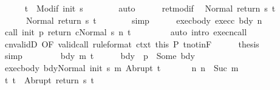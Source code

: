 \begin{isabellebody}
\ \ \ \ \isamarkupfalse%
\ {\isachardoublequoteopen}t{\isacharprime}\ {\isasymin}\ Modif\ {\isacharparenleft}init\ s{\isacharparenright}{\isachardoublequoteclose}\isanewline
\ \ \ \ \ \ \isamarkupfalse%
\ auto\isanewline
\ \ \ \ \isamarkupfalse%
\ ret{\isacharunderscore}modif\ \isamarkupfalse%
\ {\isachardoublequoteopen}Normal\ {\isacharparenleft}return{\isacharprime}\ s\ t{\isacharprime}{\isacharparenright}\ {\isacharequal}\ \isanewline
\ \ \ \ \ \ Normal\ {\isacharparenleft}return\ s\ t{\isacharprime}{\isacharparenright}{\isachardoublequoteclose}\isanewline
\ \ \ \ \ \ \isamarkupfalse%
\ simp\isanewline
\ \ \ \ \isamarkupfalse%
\ exec{\isacharunderscore}body\ exec{\isacharunderscore}c\ bdy\ n\isanewline
\ \ \ \ \isamarkupfalse%
\ {\isachardoublequoteopen}{\isasymGamma}{\isasymturnstile}{\isasymlangle}call\ init\ p\ return{\isacharprime}\ c{\isacharcomma}Normal\ s{\isasymrangle}\ {\isacharequal}n{\isasymRightarrow}\ t{\isachardoublequoteclose}\ \isanewline
\ \ \ \ \ \ \isamarkupfalse%
\ {\isacharparenleft}auto\ intro{\isacharcolon}\ execn{\isacharunderscore}call{\isacharparenright}\isanewline
\ \ \ \ \isamarkupfalse%
\ cnvalidD\ {\isacharbrackleft}OF\ valid{\isacharunderscore}call\ {\isacharbrackleft}rule{\isacharunderscore}format{\isacharbrackright}\ ctxt\ this{\isacharbrackright}\ P\ t{\isacharunderscore}notin{\isacharunderscore}F\isanewline
\ \ \ \ \isamarkupfalse%
\ {\isacharquery}thesis\isanewline
\ \ \ \ \ \ \isamarkupfalse%
\ simp\isanewline
\ \ \isamarkupfalse%
\isanewline
\ \ \ \ \isamarkupfalse%
\ bdy\ m\ t{\isacharprime}\isanewline
\ \ \ \ \isamarkupfalse%
\ bdy{\isacharcolon}\ {\isachardoublequoteopen}{\isasymGamma}\ p\ {\isacharequal}\ Some\ bdy{\isachardoublequoteclose}\isanewline
\ \ \ \ \isamarkupfalse%
\ exec{\isacharunderscore}body{\isacharcolon}\ {\isachardoublequoteopen}{\isasymGamma}{\isasymturnstile}{\isasymlangle}bdy{\isacharcomma}Normal\ {\isacharparenleft}init\ s{\isacharparenright}{\isasymrangle}\ {\isacharequal}m{\isasymRightarrow}\ Abrupt\ t{\isacharprime}{\isachardoublequoteclose}\ \isanewline
\ \ \ \ \isamarkupfalse%
\ n{\isacharcolon}\ {\isachardoublequoteopen}n\ {\isacharequal}\ Suc\ m{\isachardoublequoteclose}\isanewline
\ \ \ \ \isamarkupfalse%
\ t{\isacharcolon}\ {\isachardoublequoteopen}t\ {\isacharequal}\ Abrupt\ {\isacharparenleft}return\ s\ t{\isacharprime}{\isacharparenright}{\isachardoublequoteclose}\isanewline

\end{isabellebody}
